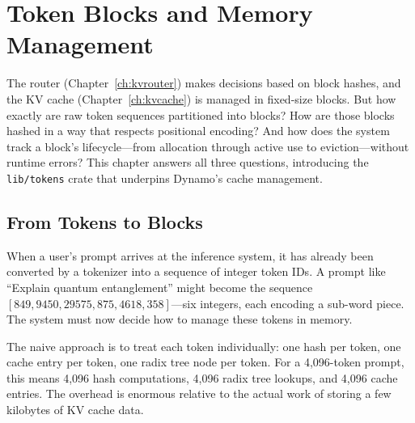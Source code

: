 \chapter{Token Blocks and Memory Management}
\label{ch:tokens}

The router (Chapter~\ref{ch:kvrouter}) makes decisions based on block hashes, and the KV cache (Chapter~\ref{ch:kvcache}) is managed in fixed-size blocks. But how exactly are raw token sequences partitioned into blocks? How are those blocks hashed in a way that respects positional encoding? And how does the system track a block's lifecycle---from allocation through active use to eviction---without runtime errors? This chapter answers all three questions, introducing the \texttt{lib/tokens} crate that underpins Dynamo's cache management.

\section{From Tokens to Blocks}
\label{sec:tokens:blocking}

%
When a user's prompt arrives at the inference system, it has already been converted by a tokenizer into a sequence of integer token IDs. A prompt like ``Explain quantum entanglement'' might become the sequence $[849, 9450, 29575, 875, 4618, 358]$---six integers, each encoding a sub-word piece. The system must now decide how to manage these tokens in memory.

The naive approach is to treat each token individually: one hash per token, one cache entry per token, one radix tree node per token. For a 4,096-token prompt, this means 4,096 hash computations, 4,096 radix tree lookups, and 4,096 cache entries. The overhead is enormous relative to the actual work of storing a few kilobytes of KV cache data.

